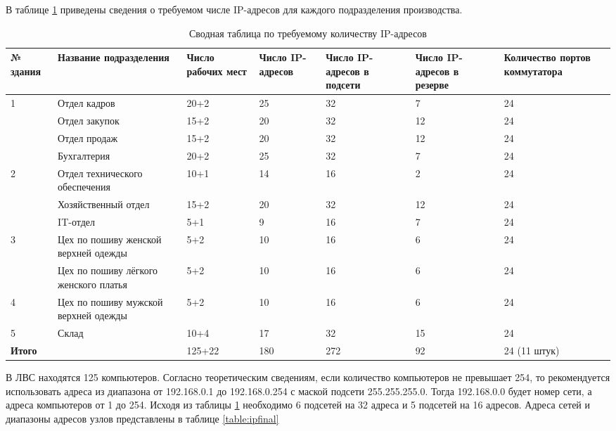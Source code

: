 В таблице \ref{table:ipnumtable} приведены сведения о требуемом числе IP-адресов для каждого подразделения производства.



\begin{table}[!htbp]
  \centering
  \begin{tabular}{p{2cm}|p{5cm}|p{2cm}|p{2cm}|p{2cm}|p{2cm}|p{2cm}}
    № здания & Название \newline подразделения & Число \newline рабочих мест & Число IP-адресов & Число IP-адресов в подсети & Число IP-адресов в резерве & Количество портов коммутатора \\ \hline
    \multirow{4}{*}{1} & Отдел кадров & 20+2 & 25 & 32 & 7 & 24  \\ 
             & Отдел закупок & 15+2 & 20 & 32 & 12  & 24 \\ 
             & Отдел продаж & 15+2 & 20 & 32 &  12 & 24 \\ 
             & Бухгалтерия & 20+2 & 25 & 32 & 7  & 24 \\ \hline
    \multirow{3}{*}{2} & Отдел технического обеспечения & 10+1 & 14 & 16 & 2 & 24   \\ 
             & Хозяйственный отдел & 15+2 & 20 & 32 & 12 & 24   \\ 
             & IT-отдел & 5+1 & 9 & 16 & 7 & 24  \\ \hline
    \multirow{2}{*}{3} & Цех по пошиву женской верхней одежды & 5+2 & 10 & 16 & 6 & 24 \\ 
             & Цех по пошиву лёгкого женского платья & 5+2 & 10 & 16 & 6 & 24 \\ \hline
    4 & Цех по пошиву мужской верхней одежды & 5+2 & 10 & 16 & 6 & 24 \\ \hline
    5 & Склад & 10+4 & 17 & 32 & 15 & 24 \\  \hline
    \textbf{Итого} & & 125+22 & 180 & 272 & 92 & 24 (11 штук)\\ \hline
  \end{tabular}
  \caption{Сводная таблица по требуемому количеству IP-адресов}
  \label{table:ipnumtable}
\end{table}


В ЛВС находятся 125 компьютеров. Согласно теоретическим сведениям, если количество компьютеров не превышает 254, то рекомендуется использовать адреса из диапазона от 192.168.0.1 до 192.168.0.254 с маской подсети 255.255.255.0. Тогда 192.168.0.0 будет номер сети, а адреса компьютеров от 1 до 254.
Исходя из таблицы \ref{table:ipnumtable} необходимо 6 подсетей на 32 адреса и 5 подсетей на 16 адресов. Адреса сетей и диапазоны адресов узлов представлены в таблице \ref{table:ipfinal}


